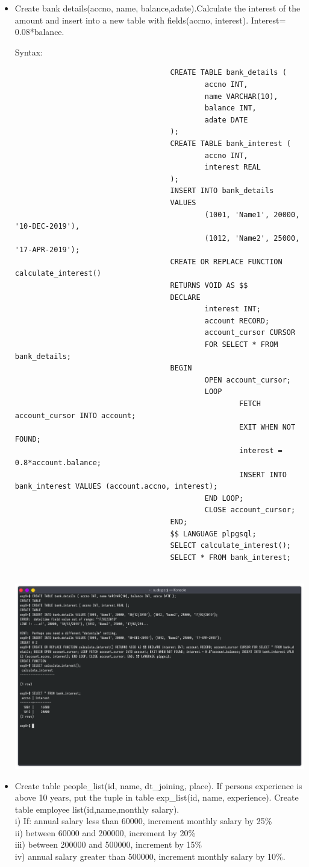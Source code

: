 \documentclass[13pt,oneside]{book}
\begin{document}
\begin{itemize}
									
									\item
									Create bank details(accno, name, balance,adate).Calculate the interest of the amount and
									 insert into a new table with fields(accno, interest). Interest= 0.08*balance.
									 
									Syntax:
									\begin{verbatim}
									CREATE TABLE bank_details (
											accno INT,
											name VARCHAR(10),
											balance INT,
											adate DATE
									);
									CREATE TABLE bank_interest (
											accno INT,
											interest REAL
									);
									INSERT INTO bank_details 
									VALUES
											(1001, 'Name1', 20000, '10-DEC-2019'),
											(1012, 'Name2', 25000, '17-APR-2019');
									CREATE OR REPLACE FUNCTION calculate_interest()
									RETURNS VOID AS $$
									DECLARE
											interest INT;
											account RECORD;
											account_cursor CURSOR
											FOR SELECT * FROM bank_details;
									BEGIN
											OPEN account_cursor;
											LOOP
													FETCH account_cursor INTO account;
													EXIT WHEN NOT FOUND;
													interest = 0.8*account.balance;
													INSERT INTO bank_interest VALUES (account.accno, interest);
											END LOOP;
											CLOSE account_cursor;
									END;
									$$ LANGUAGE plpgsql;
									SELECT calculate_interest();
									SELECT * FROM bank_interest;
									
									\end{verbatim}
									\includegraphics[width=\textwidth]{img/p9/ss2.png}
									
									
									\item
									Create table people\_list(id, name, dt\_joining, place).
									If persons experience
									 is above 10 years, put the tuple in table exp\_list(id, name, experience).
									 Create table employee list(id,name,monthly salary).\\
									 i) If: annual salary less than 60000, increment monthly salary by 25\% \\
									 ii) between 60000 and 200000, increment by 20\% \\
									 iii) between 200000 and 500000, increment by 15\% \\
									 iv) annual salary greater than 500000, increment monthly salary by 10\%.
									

\end{itemize}
\end{document}
